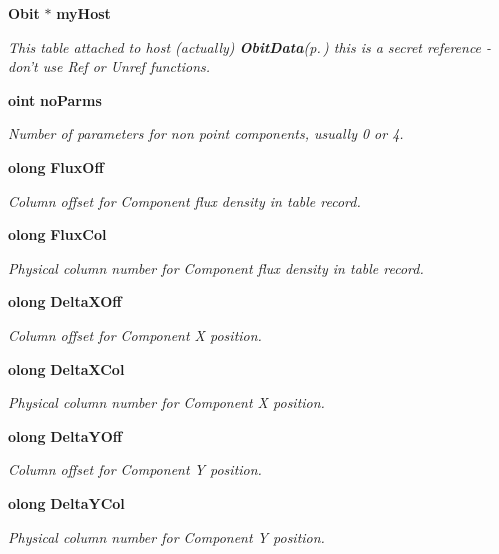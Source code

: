 \begin{CompactItemize}
{\bf Obit} $\ast$ {\bf my\-Host}
\begin{CompactList}\small\item\em This table attached to host (actually) {\bf Obit\-Data}{\rm (p.\,\pageref{structObitData})} this is a secret reference - don't use Ref or Unref functions. \item\end{CompactList}\item 
{\bf oint} {\bf no\-Parms}
\begin{CompactList}\small\item\em Number of parameters for non point components, usually 0 or 4. \item\end{CompactList}\item 
{\bf olong} {\bf Flux\-Off}
\begin{CompactList}\small\item\em Column offset for Component flux density in table record. \item\end{CompactList}\item 
{\bf olong} {\bf Flux\-Col}
\begin{CompactList}\small\item\em Physical column number for Component flux density in table record. \item\end{CompactList}\item 
{\bf olong} {\bf Delta\-XOff}
\begin{CompactList}\small\item\em Column offset for Component X position. \item\end{CompactList}\item 
{\bf olong} {\bf Delta\-XCol}
\begin{CompactList}\small\item\em Physical column number for Component X position. \item\end{CompactList}\item 
{\bf olong} {\bf Delta\-YOff}
\begin{CompactList}\small\item\em Column offset for Component Y position. \item\end{CompactList}\item 
{\bf olong} {\bf Delta\-YCol}
\begin{CompactList}\small\item\em Physical column number for Component Y position. \item\end{CompactList}\item 

\end{CompactItemize}
